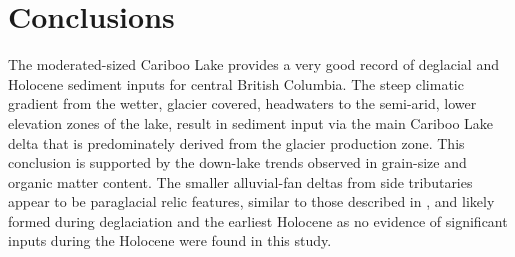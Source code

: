 \documentclass[Royal,times,doublespace,sageh]{sagej}
\begin{document}
\hypertarget{conclusions}{%
\section{Conclusions}\label{conclusions}}

The moderated-sized Cariboo Lake provides a very good record of
deglacial and Holocene sediment inputs for central British Columbia. The
steep climatic gradient from the wetter, glacier covered, headwaters to
the semi-arid, lower elevation zones of the lake, result in sediment
input via the main Cariboo Lake delta that is predominately derived from
the glacier production zone. This conclusion is supported by the
down-lake trends observed in grain-size and organic matter content. The
smaller alluvial-fan deltas from side tributaries appear to be
paraglacial relic features, similar to those described in
\citet{Church1972}, and likely formed during deglaciation and the
earliest Holocene as no evidence of significant inputs during the
Holocene were found in this study.
\end{document}
